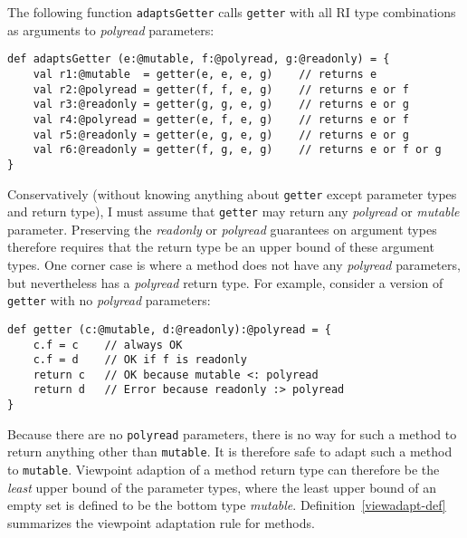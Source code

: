 \documentclass[letterpaper,11pt]{article}
\newcommand{\code}[1]{\lstinline$#1$}
\theoremstyle{definition}
\theoremstyle{remark}
\begin{document}
The following function \code{adaptsGetter} calls \code{getter} with all RI type combinations as
arguments to \emph{polyread} parameters:

\begin{lstlisting}
def adaptsGetter (e:@mutable, f:@polyread, g:@readonly) = {
	val r1:@mutable  = getter(e, e, e, g)    // returns e
	val r2:@polyread = getter(f, f, e, g)    // returns e or f
	val r3:@readonly = getter(g, g, e, g)    // returns e or g
	val r4:@polyread = getter(e, f, e, g)    // returns e or f
	val r5:@readonly = getter(e, g, e, g)    // returns e or g
	val r6:@readonly = getter(f, g, e, g)    // returns e or f or g
}
\end{lstlisting}

Conservatively (without knowing anything about \code{getter} except parameter types and return type),
I must assume that \code{getter} may return any \emph{polyread}
or \emph{mutable} parameter.
Preserving the \emph{readonly} or \emph{polyread} guarantees on argument types
therefore requires that the return type be an upper bound of these argument types.
One corner case is where a method does not have any \emph{polyread} parameters,
but nevertheless has a \emph{polyread} return type. For example, consider a version
of \code{getter} with no \emph{polyread} parameters:

\begin{lstlisting}
def getter (c:@mutable, d:@readonly):@polyread = {
	c.f = c    // always OK
	c.f = d    // OK if f is readonly
	return c   // OK because mutable <: polyread
	return d   // Error because readonly :> polyread
}
\end{lstlisting}

Because there are no \code{polyread} parameters,
there is no way for such a method to return anything other than \code{mutable}.
It is therefore safe to adapt such a method to \code{mutable}.
Viewpoint adaption of a method return type can therefore be the \emph{least} upper bound
of the parameter types, where the least upper bound of an empty set is
defined to be the bottom type \emph{mutable}.
Definition~\ref{viewadapt-def} summarizes the viewpoint adaptation rule for methods.

\end{document}
